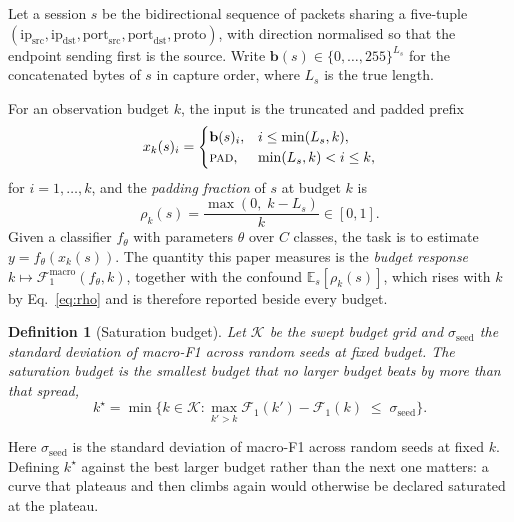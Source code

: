 \documentclass[pdflatex,sn-mathphys-num]{sn-jnl}
\theoremstyle{thmstyleone}%
\theoremstyle{thmstylethree}%
\newtheorem{definition}{Definition}%
\begin{document}
Let a session $s$ be the bidirectional sequence of packets sharing a five-tuple
$(\mathrm{ip}_{\text{src}}, \mathrm{ip}_{\text{dst}},
\mathrm{port}_{\text{src}}, \mathrm{port}_{\text{dst}}, \mathrm{proto})$, with
direction normalised so that the endpoint sending first is the source. Write
$\mathbf{b}(s) \in \{0,\dots,255\}^{L_s}$ for the concatenated bytes of $s$ in
capture order, where $L_s$ is the true length.

For an observation budget $k$, the input is the truncated and padded prefix
\begin{equation}
x_k(s)_i =
\begin{cases}
\mathbf{b}(s)_i, & i \le \min(L_s, k),\\
\textsc{pad}, & \min(L_s,k) < i \le k,
\end{cases}
\label{eq:slice}
\end{equation}
for $i = 1,\dots,k$, and the \emph{padding fraction} of $s$ at budget $k$ is
\begin{equation}
\rho_k(s) = \frac{\max(0,\; k - L_s)}{k} \in [0,1].
\label{eq:rho}
\end{equation}
Given a classifier $f_\theta$ with parameters $\theta$ over $C$ classes, the
task is to estimate
$y = f_\theta(x_k(s))$. The quantity this paper measures is the
\emph{budget response} $k \mapsto \mathcal{F}_1^{\text{macro}}(f_\theta, k)$,
together with the confound $\mathbb{E}_s[\rho_k(s)]$, which rises with $k$ by
Eq.~\eqref{eq:rho} and is therefore reported beside every budget.

\begin{definition}[Saturation budget]\label{def:sat}
Let $\mathcal{K}$ be the swept budget grid and $\sigma_{\text{seed}}$ the
standard deviation of macro-F1 across random seeds at fixed budget. The
saturation budget is the smallest budget that no larger budget beats by more
than that spread,
\begin{equation}
k^\star = \min\Big\{ k \in \mathcal{K} : \max_{k' > k} \mathcal{F}_1(k')
- \mathcal{F}_1(k) \;\le\; \sigma_{\text{seed}} \Big\}.
\label{eq:sat}
\end{equation}
\end{definition}

\noindent Here $\sigma_{\text{seed}}$ is the standard deviation of macro-F1 across
random seeds at fixed $k$. Defining $k^\star$ against the best larger budget
rather than the next one matters: a curve that plateaus and then climbs again
would otherwise be declared saturated at the plateau.
\end{document}
